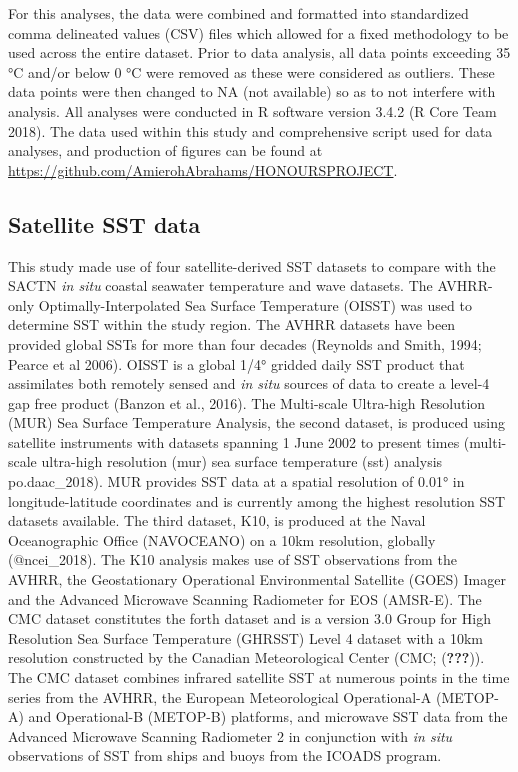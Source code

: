 \documentclass[12pt,a4paper,]{article}
\begin{document}
For this analyses, the data were combined and formatted into
standardized comma delineated values (CSV) files which allowed for a
fixed methodology to be used across the entire dataset. Prior to data
analysis, all data points exceeding 35 °C and/or below 0 °C were removed
as these were considered as outliers. These data points were then
changed to NA (not available) so as to not interfere with analysis. All
analyses were conducted in R software version 3.4.2 (R Core Team 2018).
The data used within this study and comprehensive script used for data
analyses, and production of figures can be found at
\url{https://github.com/AmierohAbrahams/HONOURSPROJECT}.

\hypertarget{satellite-sst-data}{%
\subsection{Satellite SST data}\label{satellite-sst-data}}

This study made use of four satellite-derived SST datasets to compare
with the SACTN \emph{in situ} coastal seawater temperature and wave
datasets. The AVHRR-only Optimally-Interpolated Sea Surface Temperature
(OISST) was used to determine SST within the study region. The AVHRR
datasets have been provided global SSTs for more than four decades
(Reynolds and Smith, 1994; Pearce et al 2006). OISST is a global 1/4°
gridded daily SST product that assimilates both remotely sensed and
\emph{in situ} sources of data to create a level-4 gap free product
(Banzon et al., 2016). The Multi-scale Ultra-high Resolution (MUR) Sea
Surface Temperature Analysis, the second dataset, is produced using
satellite instruments with datasets spanning 1 June 2002 to present
times (multi-scale ultra-high resolution (mur) sea surface temperature
(sst) analysis \textbar{} po.daac\_2018). MUR provides SST data at a
spatial resolution of 0.01° in longitude-latitude coordinates and is
currently among the highest resolution SST datasets available. The third
dataset, K10, is produced at the Naval Oceanographic Office (NAVOCEANO)
on a 10km resolution, globally (@ncei\_2018). The K10 analysis makes use
of SST observations from the AVHRR, the Geostationary Operational
Environmental Satellite (GOES) Imager and the Advanced Microwave
Scanning Radiometer for EOS (AMSR-E). The CMC dataset constitutes the
forth dataset and is a version 3.0 Group for High Resolution Sea Surface
Temperature (GHRSST) Level 4 dataset with a 10km resolution constructed
by the Canadian Meteorological Center (CMC; ({\textbf{???}})). The CMC
dataset combines infrared satellite SST at numerous points in the time
series from the AVHRR, the European Meteorological Operational-A
(METOP-A) and Operational-B (METOP-B) platforms, and microwave SST data
from the Advanced Microwave Scanning Radiometer 2 in conjunction with
\emph{in situ} observations of SST from ships and buoys from the ICOADS
program.
\end{document}
